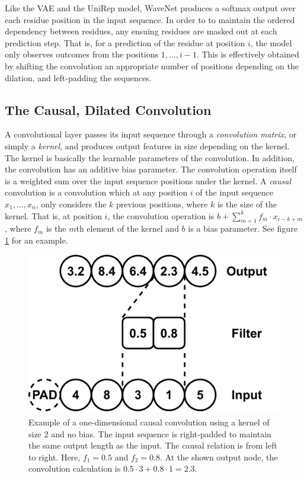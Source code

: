 Like the VAE and the UniRep model, WaveNet produces a softmax output over each residue position in the input sequence. In order to to maintain the ordered dependency between residues, any ensuing residues are masked out at each prediction step. That is, for a prediction of the residue at position $i$, the model only observes outcomes from the positions $1, \ldots, i - 1$. This is effectively obtained by shifting the convolution an appropriate number of positions depending on the dilation, and left-padding the sequences.

\subsection{The Causal, Dilated Convolution}
\label{sec:convolution}
A convolutional layer passes its input sequence through a \textit{convolution matrix}, or simply a \textit{kernel}, and produces output features in size depending on the kernel. The kernel is basically the learnable parameters of the convolution. In addition, the convolution has an additive bias parameter. The convolution operation itself is a weighted sum over the input sequence positions under the kernel. A \textit{causal} convolution is a convolution which at any position $i$ of the input sequence $x_1, \ldots, x_n$, only considers the $k$ previous positions, where $k$ is the size of the kernel. That is, at position $i$, the convolution operation is $b + \sum_{m=1}^k f_m \cdot x_{i - k + m}$, where $f_m$ is the $m$th element of the kernel and $b$ is a bias parameter. See figure \ref{fig:convolution} for an example.

\begin{figure}[H]
    \centering
    \includegraphics{report/figures/convolution.pdf}
    \caption{Example of a one-dimensional causal convolution using a kernel of size 2 and no bias. The input sequence is right-padded to maintain the same output length as the input. The causal relation is from left to right. Here, $f_1 = 0.5$ and $f_2 = 0.8$. At the shown output node, the convolution calculation is $0.5 \cdot 3 + 0.8 \cdot 1 = 2.3$.}
    \label{fig:convolution}
\end{figure}

